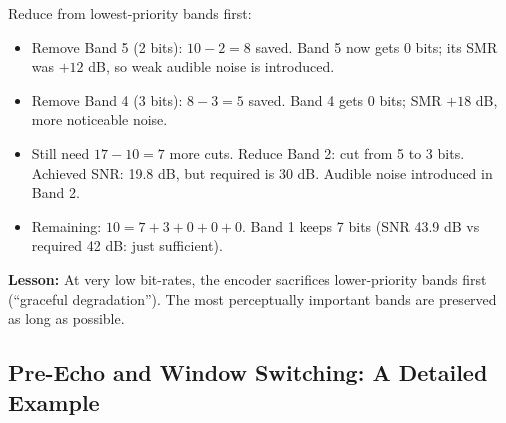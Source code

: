 \begin{examplebox}
Reduce from lowest-priority bands first:
\begin{itemize}[nosep]
  \item Remove Band 5 (2 bits): $10 - 2 = 8$ saved. Band 5 now gets 0 bits; its SMR was $+12$ dB, so weak audible noise is introduced.
  \item Remove Band 4 (3 bits): $8 - 3 = 5$ saved. Band 4 gets 0 bits; SMR $+18$ dB, more noticeable noise.
  \item Still need $17 - 10 = 7$ more cuts. Reduce Band 2: cut from 5 to 3 bits. Achieved SNR: 19.8 dB, but required is 30 dB. Audible noise introduced in Band 2.
  \item Remaining: $10 = 7 + 3 + 0 + 0 + 0$. Band 1 keeps 7 bits (SNR 43.9 dB vs required 42 dB: just sufficient).
\end{itemize}

\textbf{Lesson:} At very low bit-rates, the encoder sacrifices lower-priority bands first (``graceful degradation''). The most perceptually important bands are preserved as long as possible.
\end{examplebox}

\subsection{Pre-Echo and Window Switching: A Detailed Example}


